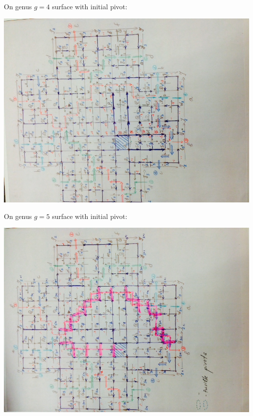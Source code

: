 \documentclass{article}
\begin{document}
\newpage
On genus $g = 4$ surface with initial pivot:
\begin{center}
\includegraphics[angle = -90, scale = 0.7]{figures/genus4_after4Pivots.jpg}
\end{center}

\newpage
On genus $g = 5$ surface with initial pivot:
\begin{center}
\includegraphics[angle = -90, scale = 0.7]{figures/genus4_after5Pivots.jpg}
\end{center}
\fi

\newpage
\nocite{*}
\printbibliography
\end{document}
